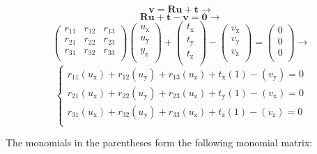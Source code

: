\begin{equation}
\textbf{v}=\textbf{R}\textbf{u}+\textbf{t} \rightarrow
\end{equation}
\begin{equation}
\textbf{R}\textbf{u}+\textbf{t}-\textbf{v}=\textbf{0} \rightarrow
\end{equation}
\begin{equation}
\begin{pmatrix}
r_{11} & r_{12} & r_{13} \\
r_{21} & r_{22} & r_{23} \\
r_{31} & r_{32} & r_{33} \\
\end{pmatrix}
\begin{pmatrix}
u_\mathrm{x} \\
u_\mathrm{y} \\
y_\mathrm{z} \\
\end{pmatrix}
+
\begin{pmatrix}
t_\mathrm{x} \\
t_\mathrm{y} \\
t_\mathrm{z} \\
\end{pmatrix}
-
\begin{pmatrix}
v_\mathrm{x} \\
v_\mathrm{y} \\
v_\mathrm{z} \\
\end{pmatrix}
=
\begin{pmatrix}
0 \\
0 \\
0 \\
\end{pmatrix}
\rightarrow
\end{equation}
\begin{equation}
\begin{cases}
r_{11} (u_\mathrm{x}) + r_{12} (u_\mathrm{y}) + r_{13} (u_\mathrm{z}) + t_\mathrm{x} (1) - (v_\mathrm{y}) = 0 \\
r_{21} (u_\mathrm{x}) + r_{22} (u_\mathrm{y}) + r_{23} (u_\mathrm{z}) + t_\mathrm{y} (1) - (v_\mathrm{x}) = 0 \\
r_{31} (u_\mathrm{x}) + r_{32} (u_\mathrm{y}) + r_{33} (u_\mathrm{z}) + t_\mathrm{z} (1) - (v_\mathrm{z}) = 0 \\
\end{cases}
\end{equation}

The monomials in the parentheses form the following monomial matrix:

